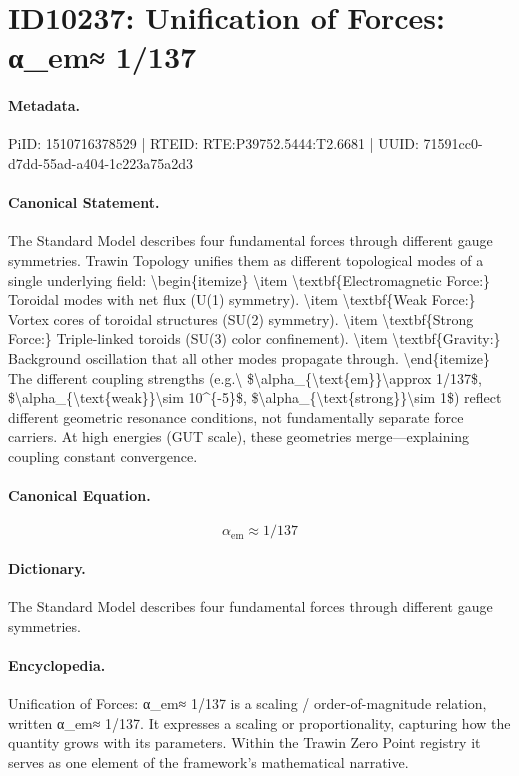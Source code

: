 \section*{ID10237: Unification of Forces: α\_em≈ 1/137}
\paragraph{Metadata.}
PiID: 1510716378529 | RTEID: RTE:P39752.5444:T2.6681 | UUID: 71591cc0-d7dd-55ad-a404-1c223a75a2d3

\paragraph{Canonical Statement.}
The Standard Model describes four fundamental forces through different gauge symmetries. Trawin Topology unifies them as different topological modes of a single underlying field: \textbackslash{}begin\{itemize\} \textbackslash{}item \textbackslash{}textbf\{Electromagnetic Force:\} Toroidal modes with net flux (U(1) symmetry). \textbackslash{}item \textbackslash{}textbf\{Weak Force:\} Vortex cores of toroidal structures (SU(2) symmetry). \textbackslash{}item \textbackslash{}textbf\{Strong Force:\} Triple-linked toroids (SU(3) color confinement). \textbackslash{}item \textbackslash{}textbf\{Gravity:\} Background oscillation that all other modes propagate through. \textbackslash{}end\{itemize\} The different coupling strengths (e.g.\textbackslash{} \$\textbackslash{}alpha\_\{\textbackslash{}text\{em\}\}\textbackslash{}approx 1/137\$, \$\textbackslash{}alpha\_\{\textbackslash{}text\{weak\}\}\textbackslash{}sim 10\textasciicircum{}\{-5\}\$, \$\textbackslash{}alpha\_\{\textbackslash{}text\{strong\}\}\textbackslash{}sim 1\$) reflect different geometric resonance conditions, not fundamentally separate force carriers. At high energies (GUT scale), these geometries merge—explaining coupling constant convergence.

\paragraph{Canonical Equation.}
\[
\alpha_{\text{em}}\approx 1/137
\]

\paragraph{Dictionary.}
The Standard Model describes four fundamental forces through different gauge symmetries.

\paragraph{Encyclopedia.}
Unification of Forces: α\_em≈ 1/137 is a scaling / order-of-magnitude relation, written α\_em≈ 1/137. It expresses a scaling or proportionality, capturing how the quantity grows with its parameters. Within the Trawin Zero Point registry it serves as one element of the framework's mathematical narrative.
